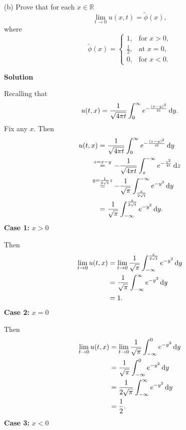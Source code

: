 \documentclass{article}
\begin{document}
\vspace{5mm}

(b) Prove that for each $x \in \mathbb{R}$
%
\begin{equation*}
    \lim_{t \to 0} u(x, t) = \widetilde{\phi}(x)
    ,
\end{equation*}
%
where
%
\begin{equation*}
    \widetilde{\phi}(x) =
        \begin{cases}
            1, & \text{for } x > 0, \\
            \frac{1}{2}, & \text{at } x = 0, \\
            0, & \text{for } x < 0.
        \end{cases}
\end{equation*}

\textbf{Solution}

Recalling that
%
\begin{equation*}
    u(t, x) = \frac{1}{\sqrt{4 \pi t}} \int_0^\infty e^{-\frac{(x - y)^2}{4t }} \dif y
    .
\end{equation*}
%
Fix any $x$. Then
%
\begin{align*}
    u(t, x)
        &= \frac{1}{\sqrt{4 \pi t}} \int_0^\infty e^{-\frac{(x - y)^2}{4t}} \dif y \\
        &\overset{\mathclap{z = x - y}}{=} \quad 
            - \frac{1}{\sqrt{4 \pi t}} \int_x^{-\infty} e^{-\frac{z^2}{4t}} \dif z \\
        &\overset{\mathclap{y = \frac{1}{2 \sqrt{t}} z}}{=} \quad
            - \frac{1}{\sqrt{\pi}} \int_{\frac{x}{2\sqrt{t}}}^{-\infty} e^{-y^2} \dif y \\
        &= \frac{1}{\sqrt{\pi}} \int_{-\infty}^{\frac{x}{2\sqrt{t}}} e^{-y^2} \dif y
        .
\end{align*}
%
\textbf{Case 1:} $x > 0$

Then
%
\begin{align*}
    \lim_{t \to 0} u(t, x)
        &= \lim_{t \to 0} \frac{1}{\sqrt{\pi}} \int_{-\infty}^{\frac{x}{2\sqrt{t}}} e^{-y^2} \dif y \\
        &= \frac{1}{\sqrt{\pi}} \int_{-\infty}^{\infty} e^{-y^2} \dif y \\
        &= 1
        .
\end{align*}
%
\textbf{Case 2:} $x = 0$

Then
%
\begin{align*}
    \lim_{t \to 0} u(t, x)
        &= \lim_{t \to 0} \frac{1}{\sqrt{\pi}} \int_{-\infty}^0 e^{-y^2} \dif y \\
        &= \frac{1}{\sqrt{\pi}} \int_{-\infty}^0 e^{-y^2} \dif y \\
        &= \frac{1}{2 \sqrt{\pi}} \int_{-\infty}^\infty e^{-y^2} \dif y \\
        &= \frac{1}{2}
        .
\end{align*}
%
\textbf{Case 3:} $x < 0$
\end{document}
